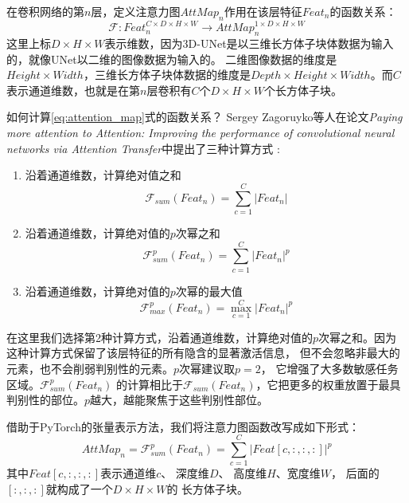 在卷积网络的第$n$层，定义注意力图${AttMap}_{n}$作用在该层特征${Feat}_{n}$的函数关系：
\begin{equation}\label{eq:attention_map}
    \mathcal{F}: {Feat}_{n}^{C \times D \times H \times W} \longrightarrow {AttMap}_{n}^{1 \times D \times H \times W}
\end{equation}
这里上标$D \times H \times W$表示维数，因为3D-UNet是以三维长方体子块体数据为输入的，就像UNet以二维的图像数据为输入的。
二维图像数据的维度是$Height \times Width$，三维长方体子块体数据的维度是$Depth \times Height \times Width$。而$C$
表示通道维数，也就是在第$n$层卷积有$C$个$D \times H \times W$个长方体子块。

如何计算\ref{eq:attention_map}式的函数关系？ Sergey Zagoruyko等人在论文\textit{Paying more attention to Attention: 
Improving the performance of convolutional neural networks via Attention Transfer}中提出了三种计算方式
\cite{Zagoruyko2016PayingMA}:
\begin{enumerate}
    \item 沿着通道维数，计算绝对值之和  
    \begin{equation}
        \mathcal{F}_{sum}({Feat}_{n}) = \sum_{c=1}^{C}{\left\lvert {Feat}_{n} \right\rvert}
    \end{equation}
    
    \item 沿着通道维数，计算绝对值的$p$次幂之和
    \begin{equation}
        \mathcal{F}_{sum}^{p}({Feat}_{n}) = \sum_{c=1}^{C}{\left\lvert {Feat}_{n} \right\rvert}^{p}
    \end{equation}
    
    \item 沿着通道维数，计算绝对值的$p$次幂的最大值
    \begin{equation}
        \mathcal{F}_{max}^{p}({Feat}_{n}) = \max_{c=1}^{C}{\left\lvert {Feat}_{n} \right\rvert}^{p}
    \end{equation}
\end{enumerate}
在这里我们选择第2种计算方式，沿着通道维数，计算绝对值的$p$次幂之和。因为这种计算方式保留了该层特征的所有隐含的显著激活信息，
但不会忽略非最大的元素，也不会削弱判别性的元素。$p$次幂建议取$p = 2$， 它增强了大多数敏感任务区域。$\mathcal{F}_{sum}^{p}({Feat}_{n})$
的计算相比于$\mathcal{F}_{sum}({Feat}_{n})$，它把更多的权重放置于最具判别性的部位。$p$越大，越能聚焦于这些判别性部位。

借助于PyTorch的张量表示方法，我们将注意力图函数改写成如下形式：
\begin{equation}
    {AttMap}_{n} = \mathcal{F}_{sum}^{p}(Feat_{n}) = \sum_{c=1}^{C}{\left\lvert {Feat}[c, :, :, :] \right\rvert}^{p}
\end{equation}
其中$Feat[c, :, :, :]$表示通道维$c$、 深度维$D$、 高度维$H$、宽度维$W$， 后面的$[:, :, :]$就构成了一个$D \times H \times W$的
长方体子块。

